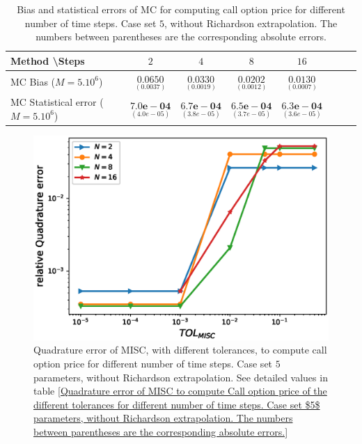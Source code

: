 \begin{table}[h!]
	\centering
	\begin{tabular}{l*{6}{c}r}
		Method \textbackslash  Steps            & $2$ & $4$ & $8$ & $16$  \\
		\hline
		MC Bias ($M=5.10^6$)   & 	$ \underset{(0.0037
			)}{\mathbf{0.0650}}$  & $\underset{(0.0019)}{\mathbf{0.0330
		}}$  & $\underset{(0.0012)}{\mathbf{0.0202}}$ & $\underset{(0.0007)}{\mathbf{0.0130}}$\\ 
		
		MC Statistical error ($M=5.10^6$)  &  $\underset{(   4.0e-05)} {\mathbf{7.0e-04}}$  & $\underset{(3.8e-05)} {\mathbf{6.7e-04}}$  & $\underset{(3.7e-05)} {\mathbf{6.5e-04 }}$ & $\underset{(3.6e-05)} {\mathbf{6.3e-04}}$	\\
		
		\hline
	\end{tabular}
	\caption{Bias and statistical errors of MC   for computing call option price  for different number of time steps. Case set $5$, without Richardson extrapolation. The numbers between parentheses are the corresponding absolute errors.}
	\label{Bias and Statistical errors of MC ($M=5.10^6$)  for computing Call option price  for different number of time steps. Case set 5, without Richardson extrapolation. The numbers between parentheses are the corresponding absolute errors.}
\end{table}
%
%
%








\begin{figure}[h!]
	\centering
	\includegraphics[width=0.5\linewidth]{./figures/rBergomi_MISC_quadratre_error/vs_TOL/set7/relative_quad_error_wrt_MISC_TOL_set7_non_rich}
	
	
	\caption{Quadrature error of MISC, with  different tolerances,  to compute call option price  for different number of time steps. Case  set $5$ parameters, without Richardson extrapolation.  See detailed values  in table \ref{Quadrature error of MISC to compute Call option price of the different tolerances for different number of time steps. Case  set $5$ parameters, without Richardson extrapolation. The numbers between parentheses are the corresponding absolute errors.}}
	\label{fig:Quadrature_error_set5}
\end{figure}


